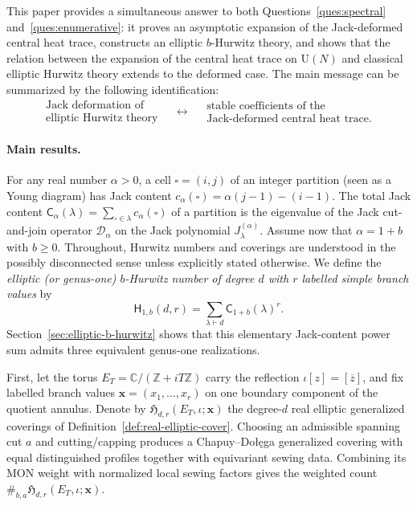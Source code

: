 \documentclass[11pt,a4paper,reqno]{article}
\theoremstyle{definition}
\theoremstyle{remark}
\newcommand\U{{\mathrm U}}
\newcommand\Z{{\mathbb Z}}
\newcommand\C{{\mathbb C}}
\newcommand\Hb{{\mathsf H}}
\begin{document}
This paper provides a simultaneous answer to both Questions~\ref{ques:spectral} and~\ref{ques:enumerative}: it proves an asymptotic expansion of the Jack-deformed central heat trace, constructs an elliptic $b$-Hurwitz theory, and shows that the relation between the expansion of the central heat trace on $\U(N)$ and classical elliptic Hurwitz theory extends to the deformed case. The main message can be summarized by the following identification:
\[
\begin{array}{c}
\text{Jack deformation of}\\ \text{elliptic Hurwitz theory}
\end{array}
\quad\longleftrightarrow\quad
\begin{array}{c}
\text{stable coefficients of the}\\
\text{Jack-deformed central heat trace}.
\end{array}
\]
\paragraph{Main results.}

For any real number $\alpha>0$, a cell $\square=(i,j)$ of an integer partition (seen as a Young diagram) has Jack content $c_\alpha(\square)=\alpha(j-1)-(i-1)$. The total Jack content $\mathsf C_{\alpha}(\lambda)=\sum_{\square\in\lambda}c_{\alpha}(\square)$ of a partition is the eigenvalue of the Jack cut-and-join operator $\mathcal D_\alpha$ on the Jack polynomial $J_\lambda^{(\alpha)}$. Assume now that $\alpha=1+b$ with $b\geq0$. Throughout, Hurwitz numbers and coverings are understood in the possibly disconnected sense unless explicitly stated otherwise. We define the \emph{elliptic (or genus-one) $b$-Hurwitz number of degree $d$ with $r$ labelled simple branch values} by
\[
\Hb_{1,b}(d,r)=\sum_{\lambda\vdash d}\mathsf C_{1+b}(\lambda)^r.
\]
Section~\ref{sec:elliptic-b-hurwitz} shows that this elementary Jack-content power sum admits three equivalent genus-one realizations.

First, let the torus $E_T=\C/(\Z+iT\Z)$ carry the reflection $\iota[z]=[\overline z]$, and fix labelled branch values $\mathbf x=(x_1,\ldots,x_r)$ on one boundary component of the quotient annulus.  Denote by $\mathfrak H_{d,r}(E_T,\iota;\mathbf x)$ the degree-$d$ real elliptic generalized coverings of Definition~\ref{def:real-elliptic-cover}.  Choosing an admissible spanning cut $a$ and cutting/capping produces a Chapuy--Do\l\k{e}ga generalized covering with equal distinguished profiles together with equivariant sewing data.  Combining its MON weight with normalized local sewing factors gives the weighted count $\#_{b,a}\mathfrak H_{d,r}(E_T,\iota;\mathbf x)$.
\end{document}

